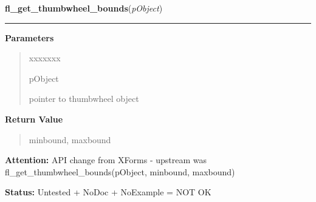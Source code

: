\hspace{.8\funcindent}\begin{boxedminipage}{\funcwidth}

    \raggedright \textbf{fl\_get\_thumbwheel\_bounds}(\textit{pObject})

    \vspace{-1.5ex}

    \rule{\textwidth}{0.5\fboxrule}
\setlength{\parskip}{2ex}
\setlength{\parskip}{1ex}
      \textbf{Parameters}
      \vspace{-1ex}

      \begin{quote}
        \begin{Ventry}{xxxxxxx}

          \item[pObject]

          pointer to thumbwheel object

        \end{Ventry}

      \end{quote}

      \textbf{Return Value}
    \vspace{-1ex}

      \begin{quote}
      minbound, maxbound

      \end{quote}

\textbf{Attention:} API change from XForms - upstream was fl\_get\_thumbwheel\_bounds(pObject, 
minbound, maxbound)



\textbf{Status:} Untested + NoDoc + NoExample = NOT OK



    \end{boxedminipage}

    \label{xformslib:library:fl_create_thumbwheel}

    \vspace{0.5ex}

